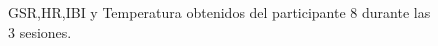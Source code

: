 \begin{figure}[h]
        \centering
        \caption{GSR,HR,IBI y Temperatura obtenidos del participante 8 durante las 3 sesiones.}\label{fig:data_p8}
\end{figure}
\pagebreak


